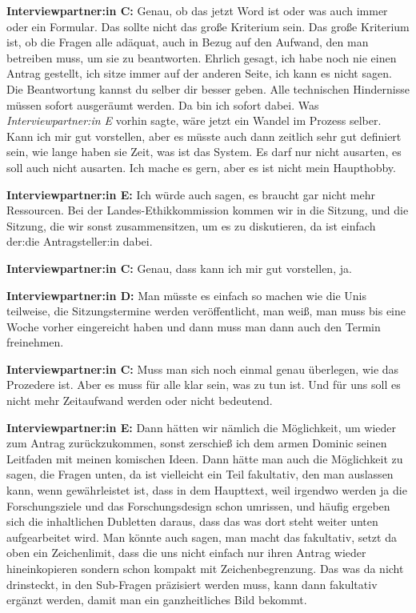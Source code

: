 \documentclass[a4paper,12pt,twoside]{scrreprt}
\begin{document}
\textbf{Interviewpartner:in C:} Genau, ob das jetzt Word ist oder was auch immer oder ein Formular. Das sollte nicht das große Kriterium sein. Das große Kriterium ist, ob die Fragen alle adäquat, auch in Bezug auf den Aufwand, den man betreiben muss, um sie zu beantworten. Ehrlich gesagt, ich habe noch nie einen Antrag gestellt, ich sitze immer auf der anderen Seite, ich kann es nicht sagen. Die Beantwortung kannst du selber dir besser geben. Alle technischen Hindernisse müssen sofort ausgeräumt werden. Da bin ich sofort dabei. Was \textit{Interviewpartner:in E} vorhin sagte, wäre jetzt ein Wandel im Prozess selber. Kann ich mir gut vorstellen, aber es müsste auch dann zeitlich sehr gut definiert sein, wie lange haben sie Zeit, was ist das System. Es darf nur nicht ausarten, es soll auch nicht ausarten. Ich mache es gern, aber es ist nicht mein Haupthobby.

\textbf{Interviewpartner:in E:} Ich würde auch sagen, es braucht gar nicht mehr Ressourcen. Bei der Landes-Ethikkommission kommen wir in die Sitzung, und die Sitzung, die wir sonst zusammensitzen, um es zu diskutieren, da ist einfach der:die Antragsteller:in dabei.

\textbf{Interviewpartner:in C:} Genau, dass kann ich mir gut vorstellen, ja.

\textbf{Interviewpartner:in D:} Man müsste es einfach so machen wie die Unis teilweise, die Sitzungstermine werden veröffentlicht, man weiß, man muss bis eine Woche vorher eingereicht haben und dann muss man dann auch den Termin freinehmen.

\textbf{Interviewpartner:in C:} Muss man sich noch einmal genau überlegen, wie das Prozedere ist. Aber es muss für alle klar sein, was zu tun ist. Und für uns soll es nicht mehr Zeitaufwand werden oder nicht bedeutend.

\textbf{Interviewpartner:in E:} Dann hätten wir nämlich die Möglichkeit, um wieder zum Antrag zurückzukommen, sonst zerschieß ich dem armen Dominic seinen Leitfaden mit meinen komischen Ideen. Dann hätte man auch die Möglichkeit zu sagen, die Fragen unten, da ist vielleicht ein Teil fakultativ, den man auslassen kann, wenn gewährleistet ist, dass in dem Haupttext, weil irgendwo werden ja die Forschungsziele und das Forschungsdesign schon umrissen, und häufig ergeben sich die inhaltlichen Dubletten daraus, dass das was dort steht weiter unten aufgearbeitet wird. Man könnte auch sagen, man macht das fakultativ, setzt da oben ein Zeichenlimit, dass die uns nicht einfach nur ihren Antrag wieder hineinkopieren sondern schon kompakt mit Zeichenbegrenzung. Das was da nicht drinsteckt, in den Sub-Fragen präzisiert werden muss, kann dann fakultativ ergänzt werden, damit man ein ganzheitliches Bild bekommt.
\end{document}
